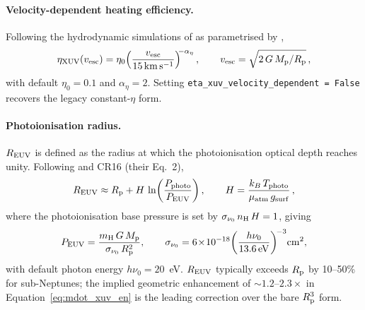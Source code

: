 \documentclass{aastex701}
\newcommand{\Mp}{M_{\rm p}}
\newcommand{\Rp}{R_{\rm p}}
\begin{document}
\paragraph{Velocity-dependent heating efficiency.}  Following the
hydrodynamic simulations of \citet{OwenJackson2012} as parametrised by
\citet{Rogers2021},
\begin{equation}\label{eq:eta_xuv}
  \eta_{\rm XUV}(v_{\rm esc})
    = \eta_{0}\!\left(\frac{v_{\rm esc}}{15\,{\rm km\,s^{-1}}}\right)^{\!\!-\alpha_{\eta}},
  \qquad v_{\rm esc} = \sqrt{2\,G\,\Mp/\Rp}\,,
\end{equation}
with default $\eta_{0} = 0.1$ and $\alpha_{\eta} = 2$.  Setting
\texttt{eta\_xuv\_velocity\_dependent = False} recovers the legacy
constant-$\eta$ form.

\paragraph{Photoionisation radius.}  $R_{\rm EUV}$ is defined as the
radius at which the photoionisation optical depth reaches unity.
Following \citet{MurrayClay2009} and CR16 (their Eq.~2),
\begin{equation}\label{eq:Reuv}
  R_{\rm EUV} \approx \Rp + H\,
    \ln\!\left(\frac{P_{\rm photo}}{P_{\rm EUV}}\right),
  \qquad H = \frac{k_{B}\,T_{\rm photo}}{\mu_{\rm atm}\,g_{\rm surf}}\,,
\end{equation}
where the photoionisation base pressure is set by
$\sigma_{\nu_{0}}\,n_{\rm H}\,H = 1$, giving
\begin{equation}\label{eq:Peuv}
  P_{\rm EUV}
    = \frac{m_{\rm H}\,G\,\Mp}{\sigma_{\nu_{0}}\,\Rp^{2}},
  \qquad
  \sigma_{\nu_{0}} = 6\!\times\!10^{-18}
    \!\left(\frac{h\nu_{0}}{13.6\,{\rm eV}}\right)^{\!-3}\!{\rm cm^{2}},
\end{equation}
with default photon energy $h\nu_{0} = 20$~eV.  $R_{\rm EUV}$
typically exceeds $\Rp$ by 10--50\% for sub-Neptunes; the implied
geometric enhancement of $\sim 1.2\text{--}2.3\times$ in
Equation~\eqref{eq:mdot_xuv_en} is the leading correction over the
bare $\Rp^{3}$ form.
\end{document}
